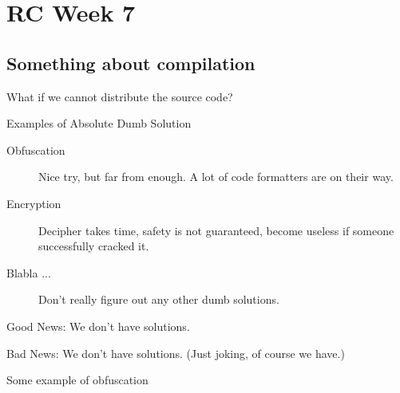\section{RC Week 7}
\subsection{Something about compilation}
\begin{frame}{What if we cannot distribute the source code?}
    \begin{block}{Examples of Absolute Dumb Solution}
		\begin{description}
        \item[Obfuscation] Nice try, but far from enough. A lot of code
            formatters are on their way.
        \item[Encryption] Decipher takes time, safety is not guaranteed, become
            useless if someone successfully cracked it.
        \item[Blabla ...] Don't really figure out any other dumb solutions.
        \end{description}
        \small{Good News: We don't have {\naive} solutions.}

        \small{Bad News: We don't have solutions. (Just joking, of course we have.)}
    \end{block}
\end{frame}

\begin{frame}[fragile]{Some example of obfuscation}
    \fontsize{3pt}{3pt}\selectfont
    \begin{figure}[htp]
        \centering
        \inputminted{c}{code/week7/obfuscation.c}
    \end{figure}
    \let\thefootnote\relax{}
\end{frame}

